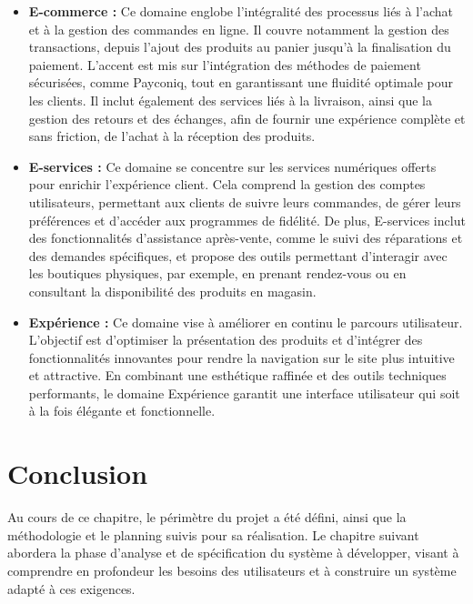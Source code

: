 \begin{itemize}
    \item \textbf{E-commerce :} Ce domaine englobe l'intégralité des processus liés à l'achat et à la gestion des commandes en ligne. Il couvre notamment la gestion des transactions, depuis l'ajout des produits au panier jusqu'à la finalisation du paiement. L'accent est mis sur l'intégration des méthodes de paiement sécurisées, comme Payconiq, tout en garantissant une fluidité optimale pour les clients. Il inclut également des services liés à la livraison, ainsi que la gestion des retours et des échanges, afin de fournir une expérience complète et sans friction, de l'achat à la réception des produits.
    \item \textbf{E-services :} Ce domaine se concentre sur les services numériques offerts pour enrichir l'expérience client. Cela comprend la gestion des comptes utilisateurs, permettant aux clients de suivre leurs commandes, de gérer leurs préférences et d'accéder aux programmes de fidélité. De plus, E-services inclut des fonctionnalités d'assistance après-vente, comme le suivi des réparations et des demandes spécifiques, et propose des outils permettant d'interagir avec les boutiques physiques, par exemple, en prenant rendez-vous ou en consultant la disponibilité des produits en magasin.
    \item \textbf{Expérience :} Ce domaine vise à améliorer en continu le parcours utilisateur. L'objectif est d'optimiser la présentation des produits et d'intégrer des fonctionnalités innovantes pour rendre la navigation sur le site plus intuitive et attractive. En combinant une esthétique raffinée et des outils techniques performants, le domaine Expérience garantit une interface utilisateur qui soit à la fois élégante et fonctionnelle.
\end{itemize}
\section*{Conclusion}
Au cours de ce chapitre, le périmètre du projet a été défini, ainsi que la méthodologie et le planning suivis pour sa réalisation. Le chapitre suivant abordera la phase d’analyse et de spécification du système à développer, visant à comprendre en profondeur les besoins des utilisateurs et à construire un système adapté à ces exigences.







